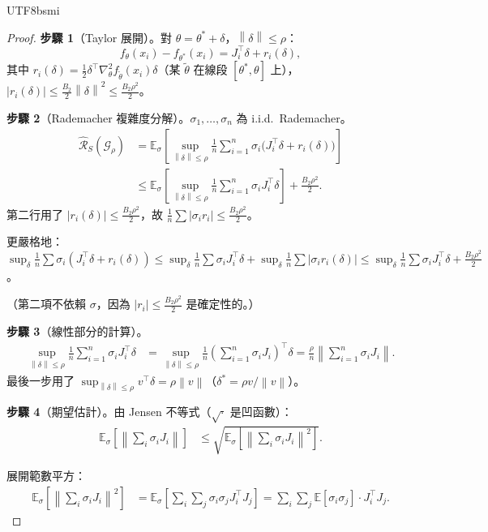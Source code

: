 \documentclass[11pt,a4paper]{article}
\theoremstyle{definition}
\newcommand{\E}{\mathbb{E}}
\newcommand{\cG}{\mathcal{G}}
\newcommand{\norm}[1]{\left\|#1\right\|}
\begin{document}
\begin{CJK}{UTF8}{bsmi}
\begin{proof}
  \textbf{步驟 1}（Taylor 展開）。對 $\theta=\theta^*+\delta$，$\norm{\delta}\leq\rho$：
  \[
    f_\theta(x_i)-f_{\theta^*}(x_i)=J_i^\top\delta+r_i(\delta),
  \]
  其中 $r_i(\delta)=\frac{1}{2}\delta^\top\nabla^2_\theta f_{\tilde\theta}(x_i)\delta$（某 $\tilde\theta$ 在線段 $[\theta^*,\theta]$ 上），$|r_i(\delta)|\leq\frac{B_2}{2}\norm{\delta}^2\leq\frac{B_2\rho^2}{2}$。

  \textbf{步驟 2}（Rademacher 複雜度分解）。$\sigma_1,\ldots,\sigma_n$ 為 i.i.d.\ Rademacher。
  \begin{align*}
    \hat{\mathcal{R}}_S(\cG_\rho)
    &=\E_\sigma\!\left[\sup_{\norm{\delta}\leq\rho}\frac{1}{n}\sum_{i=1}^n\sigma_i\bigl(J_i^\top\delta+r_i(\delta)\bigr)\right]\\
    &\leq\E_\sigma\!\left[\sup_{\norm{\delta}\leq\rho}\frac{1}{n}\sum_{i=1}^n\sigma_iJ_i^\top\delta\right]+\frac{B_2\rho^2}{2}.
  \end{align*}
  第二行用了 $|r_i(\delta)|\leq\frac{B_2\rho^2}{2}$，故 $\frac{1}{n}\sum|\sigma_ir_i|\leq\frac{B_2\rho^2}{2}$。

  更嚴格地：$\sup_\delta\frac{1}{n}\sum\sigma_i(J_i^\top\delta+r_i(\delta))
  \leq\sup_\delta\frac{1}{n}\sum\sigma_iJ_i^\top\delta+\sup_\delta\frac{1}{n}\sum|\sigma_ir_i(\delta)|
  \leq\sup_\delta\frac{1}{n}\sum\sigma_iJ_i^\top\delta+\frac{B_2\rho^2}{2}$。

  （第二項不依賴 $\sigma$，因為 $|r_i|\leq\frac{B_2\rho^2}{2}$ 是確定性的。）

  \textbf{步驟 3}（線性部分的計算）。
  \begin{align*}
    \sup_{\norm{\delta}\leq\rho}\frac{1}{n}\sum_{i=1}^n\sigma_iJ_i^\top\delta
    &=\sup_{\norm{\delta}\leq\rho}\frac{1}{n}\!\left(\sum_{i=1}^n\sigma_iJ_i\right)^\top\!\delta
    =\frac{\rho}{n}\norm{\sum_{i=1}^n\sigma_iJ_i}.
  \end{align*}
  最後一步用了 $\sup_{\norm{\delta}\leq\rho}v^\top\delta=\rho\norm{v}$（$\delta^*=\rho v/\norm{v}$）。

  \textbf{步驟 4}（期望估計）。由 Jensen 不等式（$\sqrt{\cdot}$ 是凹函數）：
  \begin{align*}
    \E_\sigma\!\left[\norm{\sum_i\sigma_iJ_i}\right]
    &\leq\sqrt{\E_\sigma\!\left[\norm{\sum_i\sigma_iJ_i}^2\right]}.
  \end{align*}

  展開範數平方：
  \begin{align*}
    \E_\sigma\!\left[\norm{\sum_i\sigma_iJ_i}^2\right]
    &=\E_\sigma\!\left[\sum_i\sum_j\sigma_i\sigma_jJ_i^\top J_j\right]
    =\sum_i\sum_j\E[\sigma_i\sigma_j]\cdot J_i^\top J_j.
  \end{align*}


\end{proof}
\end{CJK}
\end{document}
